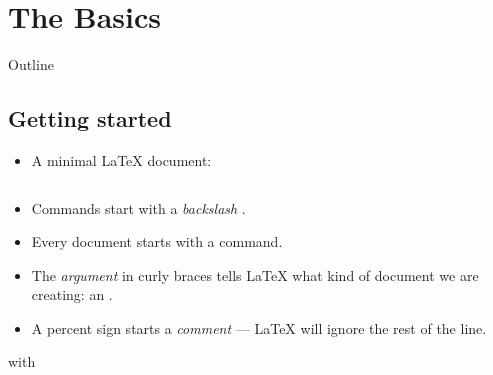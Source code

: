 \documentclass{beamer}
\begin{document}
\section{The Basics}

\begin{frame}{Outline}
\tableofcontents[currentsection]
\end{frame}


\subsection*{Getting started}
\begin{frame}[fragile]{\insertsubsection}
\begin{itemize}
\item A minimal \LaTeX{} document:
\inputminted[frame=single]{latex}{basics.tex}
\item Commands start with a \emph{backslash} \keystrokebftt{\bs}.
\item Every document starts with a  command.
\item The \emph{argument} in curly braces \keystrokebftt{\{} \keystrokebftt{\}} tells \LaTeX{} what kind of document we are creating: an .
\item A percent sign \keystrokebftt{\%} starts a \emph{comment} --- \LaTeX{}
will ignore the rest of the line.
\end{itemize}
\end{frame}

\begin{frame}[fragile]{\insertsubsection{} with \wllogo}
\end{frame}
\end{document}
